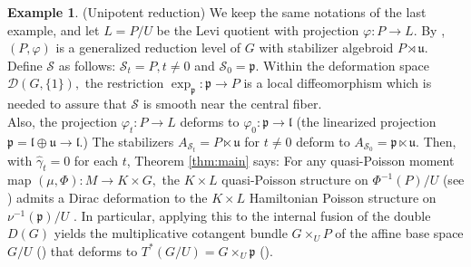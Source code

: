\documentclass[reqno]{amsart}
\theoremstyle{plain}
\theoremstyle{definition}
\newtheorem{Exp}[Thm]{Example}
\newcommand{\too}{\longrightarrow}
\renewcommand{\S}{\mathcal{S}}
\newcommand{\D}{\mathcal{D}}
\begin{document}
\begin{Exp}(Unipotent reduction)
We keep the same notations of the last example, and let $L = P/U$ be the Levi quotient with projection $\varphi: P \too L.$ By \cite[]{bualibanu2026reduction}, $(P,\varphi)$ is a generalized reduction level of $G$ with stabilizer algebroid $P \rtimes \mathfrak{u}.$ Define $\S$ as follows: $\S_t = P, t\neq 0$ and $\S_0 = \mathfrak{p}.$ Within the deformation space $\D(G,\{1\}),$ the restriction $\exp_{\mathfrak{p}}: \mathfrak{p} \too P$ is a local diffeomorphism which is needed to assure that $\S$ is smooth near the central fiber. \\  

Also, the projection $\varphi_t: P\too L$ deforms to $\varphi_0: \mathfrak{p} \too \mathfrak{l}$ (the linearized projection $\mathfrak{p} = \mathfrak{l}\oplus \mathfrak{u} \too \mathfrak{l}$.) The stabilizers $A_{\S_t} = P \ltimes \mathfrak{u}$ for $t \neq 0$ deform to $A_{\S_0} = \mathfrak{p} \ltimes \mathfrak{u}.$ Then, with $\widehat{\gamma}_t = 0$ for each $t$,  Theorem \ref{thm:main} says: For any quasi-Poisson moment map $(\mu,\Phi): M \too K\times G,$ the $K\times L$ quasi-Poisson structure on $\Phi^{-1}(P)/U$ (see \cite[]{bualibanu2026reduction}) admits a Dirac deformation to the $K\times L$ Hamiltonian Poisson structure on $\nu^{-1}(\mathfrak{p})/U$ \cite[]{bualibanu2026reduction}. In particular, applying this to the internal fusion of the double $D(G)$ yields the multiplicative cotangent bundle $G \times_{U}P$ of the affine base space $G/U$ (\cite[]{bualibanu2026reduction}) that deforms to $T^{*}(G/U) = G\times_{U} \mathfrak{p}$ (\cite[]{bualibanu2026reduction}).
\end{Exp}
 
\end{document}
